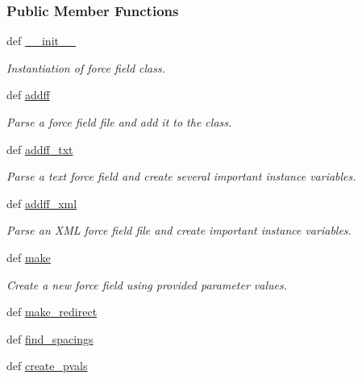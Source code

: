 \subsubsection*{Public Member Functions}
\begin{DoxyCompactItemize}
\item 
def \hyperlink{classforcebalance_1_1forcefield_1_1FF_aef2e183571128eea70132c7be2a8dc5d}{\-\_\-\-\_\-init\-\_\-\-\_\-}
\begin{DoxyCompactList}\small\item\em Instantiation of force field class. \end{DoxyCompactList}\item 
def \hyperlink{classforcebalance_1_1forcefield_1_1FF_a142d41c86b9b0ef57f93ec6fb349357b}{addff}
\begin{DoxyCompactList}\small\item\em Parse a force field file and add it to the class. \end{DoxyCompactList}\item 
def \hyperlink{classforcebalance_1_1forcefield_1_1FF_ab4b5d5b79c89ab618ae968348bdfda3a}{addff\-\_\-txt}
\begin{DoxyCompactList}\small\item\em Parse a text force field and create several important instance variables. \end{DoxyCompactList}\item 
def \hyperlink{classforcebalance_1_1forcefield_1_1FF_aaed8b2b725141c301f58016c80acec27}{addff\-\_\-xml}
\begin{DoxyCompactList}\small\item\em Parse an X\-M\-L force field file and create important instance variables. \end{DoxyCompactList}\item 
def \hyperlink{classforcebalance_1_1forcefield_1_1FF_aecd595ddb369aedd7009e6756276ffc5}{make}
\begin{DoxyCompactList}\small\item\em Create a new force field using provided parameter values. \end{DoxyCompactList}\item 
def \hyperlink{classforcebalance_1_1forcefield_1_1FF_a0540c3df2c0dece9f2711cc04fd958d4}{make\-\_\-redirect}
\item 
def \hyperlink{classforcebalance_1_1forcefield_1_1FF_a2515e2361eb460edeab69f3d7742d3d9}{find\-\_\-spacings}
\item 
def \hyperlink{classforcebalance_1_1forcefield_1_1FF_a260031479e0429e497f56987de541930}{create\-\_\-pvals}

\end{DoxyCompactItemize}
